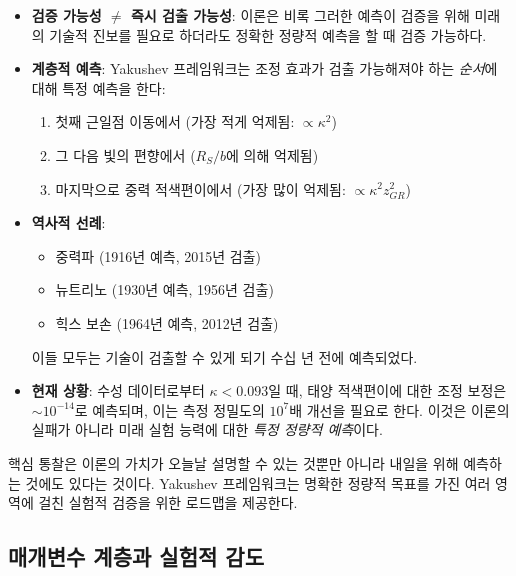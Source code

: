 \documentclass[11pt,a4paper]{article}
\begin{document}
\begin{itemize}
\item \textbf{검증 가능성 $\neq$ 즉시 검출 가능성}: 이론은 비록 그러한 예측이 검증을 위해 미래의 기술적 진보를 필요로 하더라도 정확한 정량적 예측을 할 때 검증 가능하다.

\item \textbf{계층적 예측}: Yakushev 프레임워크는 조정 효과가 검출 가능해져야 하는 \emph{순서}에 대해 특정 예측을 한다:
\begin{enumerate}
	\item 첫째 근일점 이동에서 (가장 적게 억제됨: $\propto \kappa^2$)
	\item 그 다음 빛의 편향에서 ($R_S/b$에 의해 억제됨)
	\item 마지막으로 중력 적색편이에서 (가장 많이 억제됨: $\propto \kappa^2 z_{GR}^2$)
\end{enumerate}

\item \textbf{역사적 선례}:
\begin{itemize}
	\item 중력파 (1916년 예측, 2015년 검출)
	\item 뉴트리노 (1930년 예측, 1956년 검출)
	\item 힉스 보손 (1964년 예측, 2012년 검출)
\end{itemize}
이들 모두는 기술이 검출할 수 있게 되기 수십 년 전에 예측되었다.

\item \textbf{현재 상황}: 수성 데이터로부터 $\kappa < 0.093$일 때, 태양 적색편이에 대한 조정 보정은 $\sim 10^{-14}$로 예측되며, 이는 측정 정밀도의 $10^7$배 개선을 필요로 한다. 이것은 이론의 실패가 아니라 미래 실험 능력에 대한 \emph{특정 정량적 예측}이다.
\end{itemize}

핵심 통찰은 이론의 가치가 오늘날 설명할 수 있는 것뿐만 아니라 내일을 위해 예측하는 것에도 있다는 것이다. Yakushev 프레임워크는 명확한 정량적 목표를 가진 여러 영역에 걸친 실험적 검증을 위한 로드맵을 제공한다.

\subsection{매개변수 계층과 실험적 감도}
\end{document}
